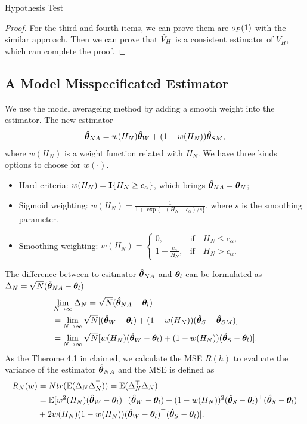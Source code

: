 \documentclass[12pt,hidelinks]{article}
\begin{document}
\begin{section}{Hypothesis Test}
\begin{proof}
For the third and fourth items, we can prove them are $o_{P}(1)$ with the similar approach.
Then we can prove that $\hat{V}_H$ is a consistent estimator of $V_H$, which can complete the proof.
\end{proof}


\subsection{A Model Misspecificated Estimator}

We use the model averageing method by adding a smooth weight into the estimator.
The new estimator 
\begin{align}\label{eq:def_thetaNA}
    {\hat{\bm{\theta}}}_{NA} = w(H_N){\hat{\bm{\theta}}}_W + (1-w(H_N)){\hat{\bm{\theta}}}_{SM},
\end{align}
where $w(H_N)$ is a weight function related with $H_N$.
We have three kinds options to choose for $w(\cdot)$.
\begin{itemize}
    \item Hard criteria: $w(H_N) = \mathbf{I}\{H_N \geq c_\alpha\}$, which brings ${\hat{\bm{\theta}}}_{NA} = \bm{\theta}_{N}$;
    \item Sigmoid weighting: $w(H_N) = \frac{1}{1+\exp\{-(H_N-c_\alpha)/s\}}$, where $s$ is the smoothing parameter.
    \item Smoothing weighting: $w(H_N) = \begin{cases}
 0, & \text{if} \quad H_N \leq c_\alpha, \\
1-\frac{c_\alpha}{H_N}, & \text{if} \quad H_N > c_\alpha.
\end{cases}$
\end{itemize}


The difference between to esitmator ${\hat{\bm{\theta}}}_{NA}$ and $\bm{\theta}_l$ can be formulated as $\Delta_N = \sqrt{N}({\hat{\bm{\theta}}}_{NA}-\bm{\theta}_l)$
\begin{align}\label{Delta}
    &\lim\limits_{N \rightarrow \infty} \Delta_N = \sqrt{N}({\hat{\bm{\theta}}}_{NA}-\bm{\theta}_l) \notag \\
    &=\lim\limits_{N \rightarrow \infty} \sqrt{N}[({\hat{\bm{\theta}}}_W - \bm{\theta}_l) + (1-w(H_N)) ({\hat{\bm{\theta}}}_S - {\hat{\bm{\theta}}}_{SM})] \notag \\
    &= \lim\limits_{N \rightarrow \infty} \sqrt{N}[w(H_N) ({\hat{\bm{\theta}}}_W - \bm{\theta}_l) + (1-w(H_N)) ({\hat{\bm{\theta}}}_S - \bm{\theta}_l)].
\end{align}
As the Therome 4.1 in \citep{hjort2003frequentist} claimed, we calculate the MSE $R(h)$ to evaluate the variance of the estimator ${\hat{\bm{\theta}}}_{NA}$ and the MSE is defined as 
\begin{align}\label{eq:Rh}
R_N(w) &= N tr(\mathbb{E}(\Delta_N \Delta_N^\top)) = \mathbb{E} (\Delta_N^\top \Delta_N) \notag \\
&= \mathbb{E}[ w^2(H_N) ({\hat{\bm{\theta}}}_W - \bm{\theta}_l)^\top ({\hat{\bm{\theta}}}_W - \bm{\theta}_l) + (1-w(H_N))^2 ({\hat{\bm{\theta}}}_S - \bm{\theta}_l)^\top ({\hat{\bm{\theta}}}_S - \bm{\theta}_l) \notag \\
&+ 2w(H_N)(1-w(H_N)) ({\hat{\bm{\theta}}}_W - \bm{\theta}_l)^\top ({\hat{\bm{\theta}}}_S - \bm{\theta}_l)].
\end{align}



\end{section}
\end{document}
